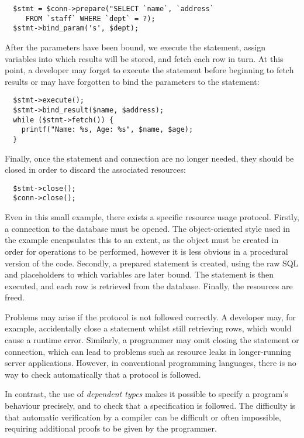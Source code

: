 \documentclass[preprint]{sigplanconf}
\begin{document}
\begin{Verbatim}
  $stmt = $conn->prepare("SELECT `name`, `address` 
     FROM `staff` WHERE `dept` = ?);
  $stmt->bind_param('s', $dept);
\end{Verbatim}
%
After the parameters have been bound, we execute the statement, assign
variables into which results will be stored, and fetch each row in turn. At
this point, a developer may forget to execute the statement before beginning to
fetch results or may have forgotten to bind the parameters to the statement:

%
\begin{Verbatim}
  $stmt->execute();
  $stmt->bind_result($name, $address);
  while ($stmt->fetch()) {
    printf("Name: %s, Age: %s", $name, $age);
  }
\end{Verbatim}
%
Finally, once the statement and connection are no longer needed, they should be
closed in order to discard the associated resources:

%
\begin{Verbatim}
  $stmt->close();
  $conn->close();
\end{Verbatim}
%
Even in this small example, there exists a specific resource usage protocol.
Firstly, a connection to the database must be opened. The object-oriented style
used in the example encapsulates this to an extent, as the object must be
created in order for operations to be performed, however it is less obvious in
a procedural version of the code. Secondly, a prepared statement is created,
using the raw SQL and placeholders to which variables are later bound. The
statement is then executed, and each row is retrieved from the database.
Finally, the resources are freed. 

Problems may arise if the protocol is not followed correctly.
A developer may, for example, accidentally close a statement whilst still
retrieving rows, which would cause a runtime error. Similarly, a programmer may
omit closing the statement or connection, which can lead to
problems such as resource leaks in longer-running server applications.
However, in conventional programming languages, there is no way to check
automatically that a protocol is followed.

In contrast, the use of \textit{dependent types} makes it possible
to specify a program's behaviour precisely, and to check that a 
specification is followed.
%
The difficulty is 
that automatic verification by a compiler can be difficult or
often impossible, requiring additional proofs to be given by the programmer.
\end{document}
